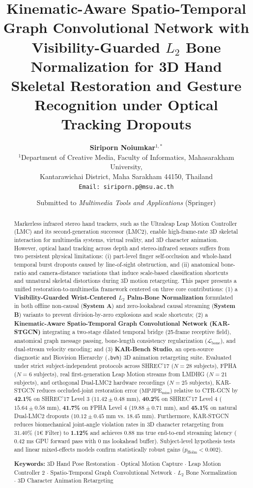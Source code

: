 \documentclass[10pt,twocolumn]{article}
\title{\textbf{Kinematic-Aware Spatio-Temporal Graph Convolutional Network with Visibility-Guarded $L_2$ Bone Normalization for 3D Hand Skeletal Restoration and Gesture Recognition under Optical Tracking Dropouts}}
\author{
  \textbf{Siriporn Noiumkar}$^{1,*}$ \\
  $^{1}$Department of Creative Media, Faculty of Informatics, Mahasarakham University, \\
  Kantarawichai District, Maha Sarakham 44150, Thailand \\
  \texttt{Email: siriporn.p@msu.ac.th}
}
\date{Submitted to \textit{Multimedia Tools and Applications} (Springer)}
\begin{document}
\maketitle

\begin{abstract}
Markerless infrared stereo hand trackers, such as the Ultraleap Leap Motion Controller (LMC) and its second-generation successor (LMC2), enable high-frame-rate 3D skeletal interaction for multimedia systems, virtual reality, and 3D character animation. However, optical hand tracking across depth and stereo-infrared sensors suffers from two persistent physical limitations: (i) part-level finger self-occlusion and whole-hand temporal burst dropouts caused by line-of-sight obstruction, and (ii) anatomical bone-ratio and camera-distance variations that induce scale-based classification shortcuts and unnatural skeletal distortions during 3D motion retargeting. This paper presents a unified restoration-to-multimedia framework centered on three core contributions: (1) a \textbf{Visibility-Guarded Wrist-Centered $L_2$ Palm-Bone Normalization} formulated in both offline non-causal (\textbf{System A}) and zero-lookahead causal streaming (\textbf{System B}) variants to prevent division-by-zero explosions and scale shortcuts; (2) a \textbf{Kinematic-Aware Spatio-Temporal Graph Convolutional Network (KAR-STGCN)} integrating a two-stage dilated temporal bridge (25-frame receptive field), anatomical graph message passing, bone-length consistency regularization ($\mathcal{L}_{\text{bone}}$), and dual-stream velocity encoding; and (3) \textbf{KAR-Bench Studio}, an open-source diagnostic and Biovision Hierarchy (\texttt{.bvh}) 3D animation retargeting suite. Evaluated under strict subject-independent protocols across SHREC'17 ($N=28$ subjects), FPHA ($N=6$ subjects), real first-generation Leap Motion streams from LMDHG ($N=21$ subjects), and orthogonal Dual-LMC2 hardware recordings ($N=25$ subjects), KAR-STGCN reduces occluded-joint restoration error ($\text{MPJPE}_{\text{miss}}$) relative to CTR-GCN by \textbf{42.1\%} on SHREC'17 Level 3 ($11.42 \pm 0.48\text{ mm}$), \textbf{40.2\%} on SHREC'17 Level 4 ($15.64 \pm 0.58\text{ mm}$), \textbf{41.7\%} on FPHA Level 4 ($19.88 \pm 0.71\text{ mm}$), and \textbf{45.1\%} on natural Dual-LMC2 dropouts ($10.12 \pm 0.45\text{ mm}$ vs. $18.45\text{ mm}$). Furthermore, KAR-STGCN reduces biomechanical joint-angle violation rates in 3D character retargeting from $31.40\%$ ($1\text{€}$ Filter) to \textbf{1.12\%} and achieves $0.88\text{ ms}$ true end-to-end streaming latency ($0.42\text{ ms}$ GPU forward pass with $0\text{ ms}$ lookahead buffer). Subject-level hypothesis tests and linear mixed-effects models confirm statistically robust gains ($p_{\text{Holm}} < 0.002$).

\vspace{0.6em}
\noindent\textbf{Keywords:} 3D Hand Pose Restoration $\cdot$ Optical Motion Capture $\cdot$ Leap Motion Controller 2 $\cdot$ Spatio-Temporal Graph Convolutional Network $\cdot$ $L_2$ Bone Normalization $\cdot$ 3D Character Animation Retargeting
\end{abstract}
\end{document}
